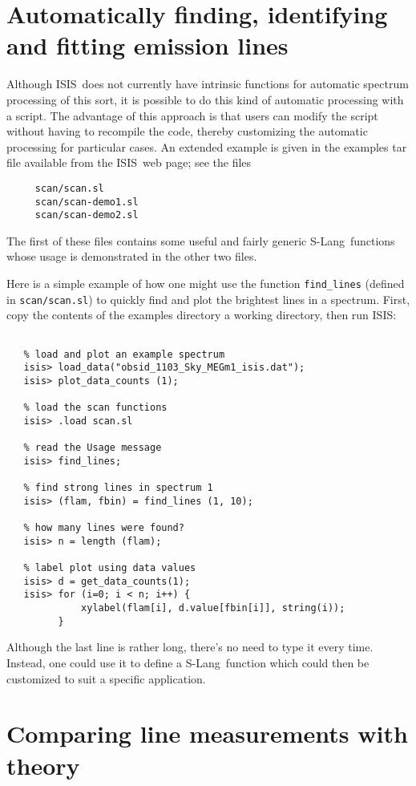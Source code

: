 \documentclass{book}
\newcommand{\isisx}{{\sc ISIS~}}
\newcommand{\isis}{{\sc ISIS}}
\newcommand{\slang}{{\sc S-Lang}}
\begin{document}
\section{Automatically finding, identifying and fitting emission lines}

Although \isisx does not currently have intrinsic functions for
automatic spectrum processing of this sort, it is possible to do this
kind of automatic processing with a script.  The advantage of this
approach is that users can modify the script without having to
recompile the code, thereby customizing the automatic processing for
particular cases. An extended example is given in the
examples tar file available from the \isisx web page;
see the files
\begin{verbatim}
     scan/scan.sl
     scan/scan-demo1.sl
     scan/scan-demo2.sl
\end{verbatim}
The first of these files contains some useful and fairly generic \slang\ functions
whose usage is demonstrated in the other two files.

Here is a simple example of how one might use the function {\tt find\_lines}
(defined in {\tt scan/scan.sl}) to quickly find and plot
the brightest lines in a spectrum. First, copy the contents of the
examples directory a working directory, then run \isis:
\begin{verbatim}

   % load and plot an example spectrum
   isis> load_data("obsid_1103_Sky_MEGm1_isis.dat");
   isis> plot_data_counts (1);

   % load the scan functions
   isis> .load scan.sl

   % read the Usage message
   isis> find_lines;

   % find strong lines in spectrum 1
   isis> (flam, fbin) = find_lines (1, 10);

   % how many lines were found?
   isis> n = length (flam);

   % label plot using data values
   isis> d = get_data_counts(1);
   isis> for (i=0; i < n; i++) {
             xylabel(flam[i], d.value[fbin[i]], string(i));
         }
\end{verbatim}
Although the last line is rather long, there's no need to type it
every time.  Instead, one could use it to define a \slang\
function which could then be customized to suit a specific application.

\section{Comparing line measurements with theory}
\end{document}
